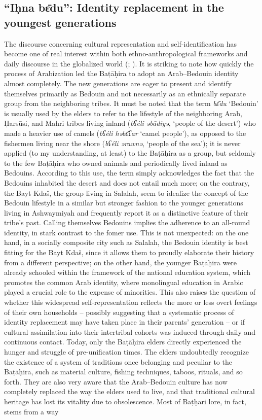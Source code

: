 \documentclass[output=paper]{langscibook}
\begin{document}
\subsection{``Iḥna bɛ̄du'': Identity replacement in the youngest generations}
The discourse concerning cultural representation and self-identification has become one of real interest within both ethno-anthropological frameworks and daily discourse in the globalized world (\citealt{fardon_production_1995}; \citealt{hannerz_fluxos_1997}). It is striking to note how quickly the process of Arabization led the Baṭāḥira to adopt an Arab–Bedouin identity almost completely. The new generations are eager to present and identify themselves primarily as Bedouin and not necessarily as an ethnically separate group from the neighboring tribes. It must be noted that the term \textit{bɛ̄du} ‘Bedouin’ is usually used by the elders to refer to the lifestyle of the neighboring Arab, Ḥarsūsi, and Mahri tribes living inland (\textit{bʕéli əbādiyə}, ‘people of the desert’) who made a heavier use of camels (\textit{bʕéli həbɛ̄ʕar }‘camel people’), as opposed to the fishermen living near the shore (\textit{bʕéli ərawnə}, ‘people of the sea’); it is never applied (to my understanding, at least) to the Baṭāḥira as a group, but seldomly to the few Baṭāḥira who owned animals and periodically lived inland as Bedouins. According to this use, the term simply acknowledges the fact that the Bedouins inhabited the desert and does not entail much more; on the contrary, the Bayt Kdaš, the group living in Salalah, seem to idealize the concept of the Bedouin lifestyle in a similar but stronger fashion to the younger generations living in Ashwaymiyah and frequently report it as a distinctive feature of their tribe’s past. Calling themselves  Bedouins implies the adherence to an all-round identity, in stark contrast to the fomer use. This is not unexpected: on the one hand, in a socially composite city such as Salalah, the Bedouin identity is best fitting for the Bayt Kdaš, since it allows them to proudly elaborate their history from a different perspective; on the other hand, the younger Baṭāḥira were already schooled within the framework of the national education system, which promotes the common Arab identity, where monolingual education in Arabic played a crucial role to the expense of minorities. This also raises the question of whether this widespread self-representation reflects the more or less overt feelings of their own households – possibly suggesting that a systematic process of identity replacement may have taken place in their parents’ generation – or if cultural assimilation into their intertribal cohorts was induced through daily and continuous contact. Today, only the Baṭāḥira elders directly experienced the hunger and struggle of pre-unification times. The elders undoubtedly recognize the existence of a system of traditions once belonging and peculiar to the Baṭāḥira, such as material culture, fishing techniques, taboos, rituals, and so forth. They are also very aware that the Arab–Bedouin culture has now completely replaced the way the elders used to live, and that traditional cultural heritage has lost its vitality due to obsolescence. Most of Baṭḥari lore, in fact, stems from a way 
\end{document}
